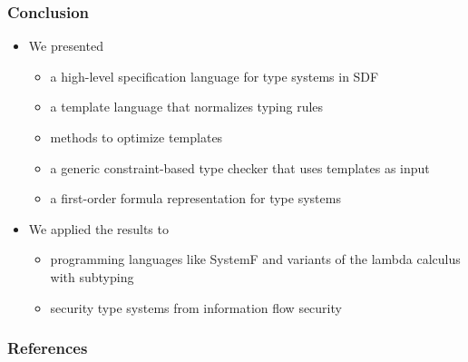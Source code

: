 \documentclass{beamer}
\begin{document}
\begin{frame}
  \frametitle{Conclusion}
  \begin{itemize}
  \item We presented
    \begin{itemize}
    \item a high-level specification language for type systems in SDF
    \item a template language that normalizes typing rules
    \item methods to optimize templates
    \item a generic constraint-based type checker that uses templates
      as input
    \item a first-order formula representation for type systems
    \end{itemize}
  \item We applied the results to
    \begin{itemize}
    \item programming languages like SystemF and variants of the lambda
      calculus with subtyping
    \item security type systems from information flow
      security~\cite{Volpano:1996:STS:353629.353648}
    \end{itemize}
  \end{itemize}
\end{frame}

\begin{frame}
  \frametitle{References}
  
  
\end{frame}
\end{document}
